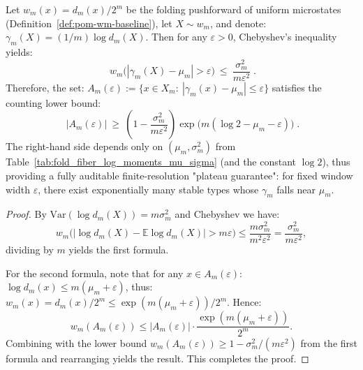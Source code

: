 \begin{proposition}\label{prop:pom-spectrum-finite-m-plateau}
Let $w_m(x)=d_m(x)/2^m$ be the folding pushforward of uniform microstates (Definition~\ref{def:pom-wm-baseline}), let $X\sim w_m$, and denote:
\(
\gamma_m(X)=(1/m)\log d_m(X)
\).
Then for any $\varepsilon>0$, Chebyshev's inequality yields:
\[
\boxed{\;
w_m\!\bigl(|\gamma_m(X)-\mu_m|>\varepsilon\bigr)\ \le\ \frac{\sigma_m^2}{m\varepsilon^2}\; }.
\]
Therefore, the set:
\(
A_m(\varepsilon):=\{x\in X_m:\ |\gamma_m(x)-\mu_m|\le \varepsilon\}
\)
satisfies the counting lower bound:
\[
\boxed{\;
|A_m(\varepsilon)|
\ \ge\
\left(1-\frac{\sigma_m^2}{m\varepsilon^2}\right)
\exp\!\bigl(m(\log 2-\mu_m-\varepsilon)\bigr)\; }.
\]
The right-hand side depends only on $(\mu_m,\sigma_m^2)$ from Table~\ref{tab:fold_fiber_log_moments_mu_sigma} (and the constant $\log 2$), thus providing a fully auditable finite-resolution "plateau guarantee": for fixed window width $\varepsilon$, there exist exponentially many stable types whose $\gamma_m$ falls near $\mu_m$.
\end{proposition}
\begin{proof}
By $\mathrm{Var}(\log d_m(X))=m\sigma_m^2$ and Chebyshev we have:
\[
w_m\bigl(|\log d_m(X)-\mathbb{E}\log d_m(X)|>m\varepsilon\bigr)
\le \frac{m\sigma_m^2}{m^2\varepsilon^2}
=\frac{\sigma_m^2}{m\varepsilon^2},
\]
dividing by $m$ yields the first formula.
\par
For the second formula, note that for any $x\in A_m(\varepsilon)$:
\(
\log d_m(x)\le m(\mu_m+\varepsilon)
\),
thus:
\(
w_m(x)=d_m(x)/2^m\le \exp(m(\mu_m+\varepsilon))/2^m
\).
Hence:
\[
w_m(A_m(\varepsilon))
\le |A_m(\varepsilon)|\cdot \frac{\exp(m(\mu_m+\varepsilon))}{2^m}.
\]
Combining with the lower bound $w_m(A_m(\varepsilon))\ge 1-\sigma_m^2/(m\varepsilon^2)$ from the first formula and rearranging yields the result. This completes the proof.
\end{proof}


